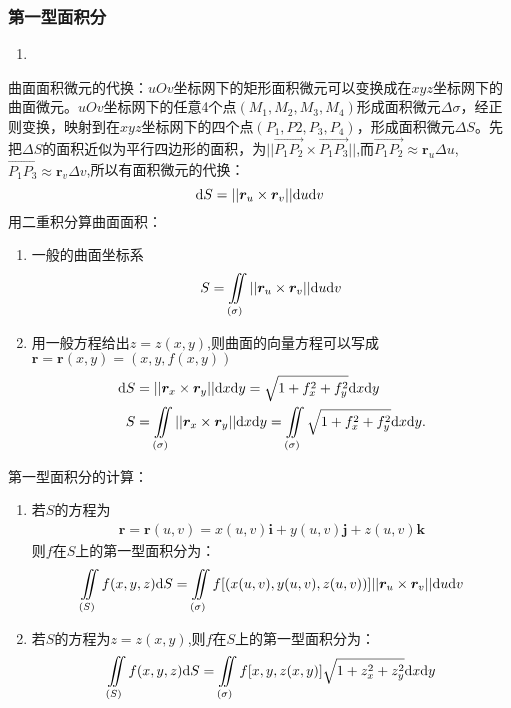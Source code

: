 \subsubsection{第一型面积分}
\begin{enumerate}
	\item 
\end{enumerate}
曲面面积微元的代换：$uOv$坐标网下的矩形面积微元可以变换成在$xyz$坐标网下的曲面微元。$uOv$坐标网下的任意4个点$(M_1,M_2,M_3,M_4)$形成面积微元$\Delta \sigma$，经正则变换，映射到在$xyz$坐标网下的四个点$(P_1,P2,P_3,P_4)$，形成面积微元$\Delta S$。先把$\Delta S$的面积近似为平行四边形的面积，为$||\overrightarrow{P_1P_2} \times \overrightarrow{P_1P_3}||$,而$\overrightarrow{P_1P_2} \approx \boldsymbol{r}_u \Delta u$,$\overrightarrow{P_1P_3} \approx \boldsymbol{r}_v \Delta v$,所以有面积微元的代换：
\begin{equation}\label{key}
	\mathrm{d} S = ||\boldsymbol{r}_u \times \boldsymbol{r}_v|| \mathrm{d} u \mathrm{d} v 
\end{equation}
用二重积分算曲面面积：
\begin{enumerate}
	\item 一般的曲面坐标系\\
	\begin{equation}\label{key}
		S = \iint\limits_{(\sigma)} ||\boldsymbol{r}_u \times \boldsymbol{r}_v|| \mathrm{d} u \mathrm{d} v 
	\end{equation}
	\item 用一般方程给出$z=z(x,y)$,则曲面的向量方程可以写成$\boldsymbol{r}=\boldsymbol{r}(x,y)=(x,y,f(x,y))$
	\begin{align}
		\mathrm{d} S &= ||\boldsymbol{r}_x \times \boldsymbol{r}_y|| \mathrm{d} x \mathrm{d} y=  \sqrt{1+f^2_x+f^2_y}\mathrm{d} x \mathrm{d} y\\
		S &= \iint\limits_{(\sigma)} ||\boldsymbol{r}_x \times \boldsymbol{r}_y|| \mathrm{d} x \mathrm{d} y=\iint\limits_{(\sigma)} \sqrt{1+f^2_x+f^2_y} \mathrm{d} x \mathrm{d} y.
	\end{align}
\end{enumerate}
第一型面积分的计算：
\begin{enumerate}
	\item 若$S$的方程为
	\begin{align}
		\boldsymbol{r}= \boldsymbol{r}(u,v)=x(u,v)\boldsymbol{i}+y(u,v)\boldsymbol{j}+z(u,v)\boldsymbol{k}
	\end{align}
	则$f$在$S$上的第一型面积分为：
	\begin{equation}\label{key}
		\iint\limits_{(S)} f(x,y,z) \mathrm{d} S= \iint\limits_{(\sigma)} f[(x(u,v),y(u,v),z(u,v))] ||\boldsymbol{r}_u \times \boldsymbol{r}_v|| \mathrm{d} u \mathrm{d} v 
	\end{equation}
	\item 若$S$的方程为$z=z(x,y)$,则$f$在$S$上的第一型面积分为：
	\begin{equation}\label{key}
		\iint\limits_{(S)} f(x,y,z) \mathrm{d} S= \iint\limits_{(\sigma)} f[x,y,z(x,y)] \sqrt{1+z^2_x+z^2_y} \mathrm{d} x \mathrm{d} y
	\end{equation}
\end{enumerate}

